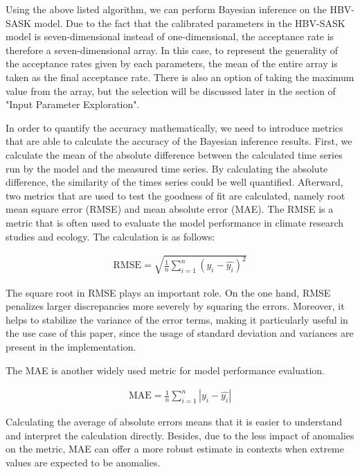Using the above listed algorithm, we can perform Bayesian inference on the HBV-SASK model. Due to the fact that the calibrated parameters in the HBV-SASK model is seven-dimensional instead of one-dimensional, the acceptance rate is therefore a seven-dimensional array. In this case, to represent the generality of the acceptance rates given by each parameters, the mean of the entire array is taken as the final acceptance rate. There is also an option of taking the maximum value from the array, but the selection will be discussed later in the section of "Input Parameter Exploration".

In order to quantify the accuracy mathematically, we need to introduce metrics that are able to calculate the accuracy of the Bayesian inference results. First, we calculate the mean of the absolute difference between the calculated time series run by the model and the measured time series. By calculating the absolute difference, the similarity of the times series could be well quantified. Afterward, two metrics that are used to test the goodness of fit are calculated, namely root mean square error (RMSE) and mean absolute error (MAE). The RMSE is a metric that is often used to evaluate the model performance in climate research studies and ecology. The calculation is as follows: 

\begin{align}
\text{RMSE} = \sqrt{\frac 1 n \sum_{i=1}^n (y_i - \hat{y_i})^2}
\end{align}

The square root in RMSE plays an important role. On the one hand, RMSE penalizes larger discrepancies more severely by squaring the errors. Moreover, it helps to stabilize the variance of the error terms, making it particularly useful in the use case of this paper, since the usage of standard deviation and variances are present in the implementation.\cite{RMSE_MAE}

The MAE is another widely used metric for model performance evaluation.\cite{RMSE_MAE} 

\begin{align}
\text{MAE} = \frac 1 n \sum_{i=1}^n |y_i - \hat{y_i}|
\end{align}

Calculating the average of absolute errors means that it is easier to understand and interpret the calculation directly. Besides, due to the less impact of anomalies on the metric,\cite{RMSE_MAE} MAE can offer a more robust estimate in contexts when extreme values are expected to be anomalies.

